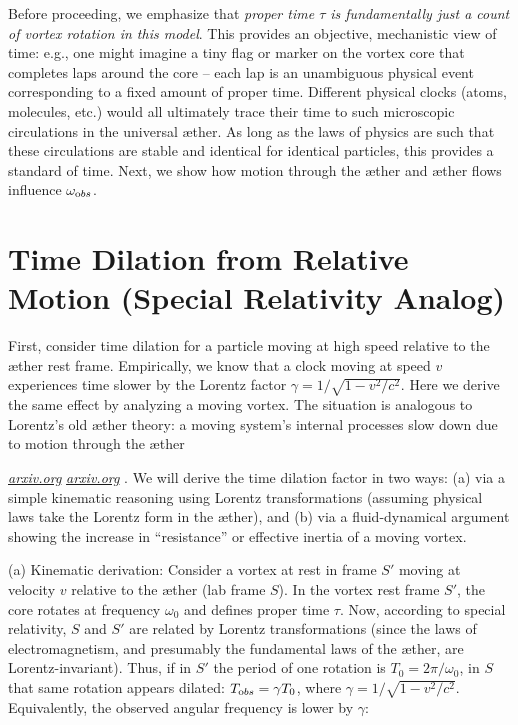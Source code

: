 \documentclass[aps,preprint,superscriptaddress]{revtex4}
\begin{document}
Before proceeding, we emphasize that \textit{proper time $\tau$ is fundamentally just a count of vortex rotation in this model}. This provides an objective, mechanistic view of time: e.g., one might imagine a tiny flag or marker on the vortex core that completes laps around the core – each lap is an unambiguous physical event corresponding to a fixed amount of proper time. Different physical clocks (atoms, molecules, etc.) would all ultimately trace their time to such microscopic circulations in the universal æther. As long as the laws of physics are such that these circulations are stable and identical for identical particles, this provides a standard of time. Next, we show how motion through the æther and æther flows influence $\omega_{\textrm obs}$.

\section*{Time Dilation from Relative Motion (Special Relativity Analog)}

First, consider time dilation for a particle moving at high speed relative to the æther rest frame. Empirically, we know that a clock moving at speed $v$ experiences time slower by the Lorentz factor $\gamma = 1/\sqrt{1-v^2/c^2}$. Here we derive the same effect by analyzing a moving vortex. The situation is analogous to Lorentz’s old æther theory: a moving system’s internal processes slow down due to motion through the æther

\href{https://arxiv.org/pdf/physics/0611077#:~:text=relativity%20theory%2C%20but%20obviously%20its,light%20in%20all%20inertial%20frames}{\textit{arxiv.org}}
\href{https://arxiv.org/pdf/physics/0611077#:~:text=We%20should%20note%20that%2C%20when,a%20state%20of%20absolute%20rest}{\textit{arxiv.org}}
. We will derive the time dilation factor in two ways: (a) via a simple kinematic reasoning using Lorentz transformations (assuming physical laws take the Lorentz form in the æther), and (b) via a fluid-dynamical argument showing the increase in “resistance” or effective inertia of a moving vortex.

(a) Kinematic derivation: Consider a vortex at rest in frame $S'$ moving at velocity $v$ relative to the æther (lab frame $S$). In the vortex rest frame $S'$, the core rotates at frequency $\omega_0$ and defines proper time $\tau$. Now, according to special relativity, $S$ and $S'$ are related by Lorentz transformations (since the laws of electromagnetism, and presumably the fundamental laws of the æther, are Lorentz-invariant). Thus, if in $S'$ the period of one rotation is $T_0 = 2\pi/\omega_0$, in $S$ that same rotation appears dilated: $T_{\textrm obs} = \gamma T_0$, where $\gamma = 1/\sqrt{1-v^2/c^2}$. Equivalently, the observed angular frequency is lower by $\gamma$:
\end{document}
